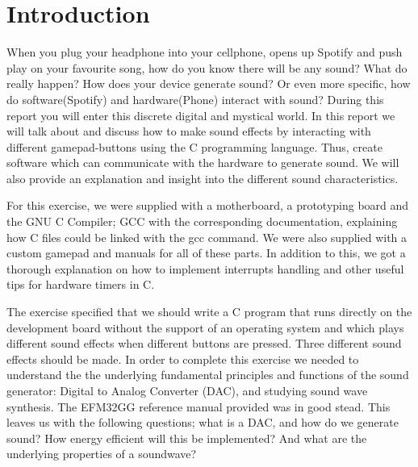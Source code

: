 \chapter{Introduction}

When you plug your headphone into your cellphone, opens up Spotify and push play on your favourite song, how do you know there will be any sound? What do really happen? How does your device generate sound? Or even more specific, how do software(Spotify) and hardware(Phone) interact with sound? During this report you will enter this discrete digital and mystical world. In this report we will talk about and discuss how to make sound effects by interacting with different gamepad-buttons using the C programming language. Thus, create software which can communicate with the hardware to generate sound. We will also provide an explanation and insight into the different sound characteristics.

For this exercise, we were supplied with a motherboard, a prototyping board and the GNU C Compiler; GCC with the corresponding documentation, explaining how C files could be linked with the gcc command. We were also supplied with a custom gamepad and manuals for all of these parts. In addition to this, we got a thorough explanation on how to implement interrupts handling and other useful tips for hardware timers in C. 

The exercise specified that we should write a C program that runs directly on the development board without the support of an operating system and which plays different sound effects when different buttons are pressed. Three different sound effects should be made. In order to complete this exercise we needed to understand the the underlying fundamental principles and functions of the sound generator: Digital to Analog Converter (DAC), and studying sound wave synthesis. The EFM32GG reference manual provided was in good stead. 
This leaves us with the following questions; what is a DAC, and how do we generate sound? How energy efficient will this be implemented? And what are the underlying properties of a soundwave?